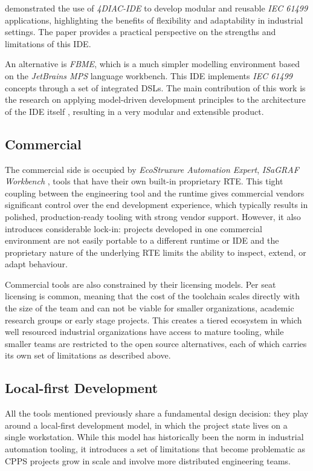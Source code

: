 \citeauthor{zoitl_developing_2013} \cite{zoitl_developing_2013} demonstrated the use of \textit{4DIAC-IDE} to develop modular and reusable \textit{IEC 61499} applications, highlighting the benefits of flexibility and adaptability in industrial settings. The paper provides a practical perspective on the strengths and limitations of this \ac{IDE}.

An alternative is \textit{FBME}, which is a much simpler modelling environment based on the \textit{JetBrains MPS} language workbench. This \ac{IDE} implements \textit{IEC 61499} concepts through a set of integrated \acp{DSL}. The main contribution of this work is the research on applying model-driven development principles to the architecture of the \ac{IDE} itself \cite{sorokin_novel_2022}, resulting in a very modular and extensible product.

\subsection{Commercial}
The commercial side is occupied by \textit{EcoStruxure Automation Expert}, \textit{ISaGRAF Workbench} \cite{vyatkin_comparisons_2008}, tools that have their own built-in proprietary \ac{RTE}. This tight coupling between the engineering tool and the runtime gives commercial vendors significant control over the end development experience, which typically results in polished, production-ready tooling with strong vendor support. However, it also introduces considerable lock-in: projects developed in one commercial environment are not easily portable to a different runtime or \ac{IDE} and the proprietary nature of the underlying \ac{RTE} limits the ability to inspect, extend, or adapt behaviour.

Commercial tools are also constrained by their licensing models. Per seat licensing is common, meaning that the cost of the toolchain scales directly with the size of the team and can not be viable for smaller organizations, academic research groups or early stage projects. This creates a tiered ecosystem in which well resourced industrial organizations have access to mature tooling, while smaller teams are restricted to the open source alternatives, each of which carries its own set of limitations as described above.

\subsection{Local-first Development} \label{sec:localfirst}
All the tools mentioned previously share a fundamental design decision: they play around a local-first development model, in which the project state lives on a single workstation. While this model has historically been the norm in industrial automation tooling, it introduces a set of limitations that become problematic as \ac{CPPS} projects grow in scale and involve more distributed engineering teams.

